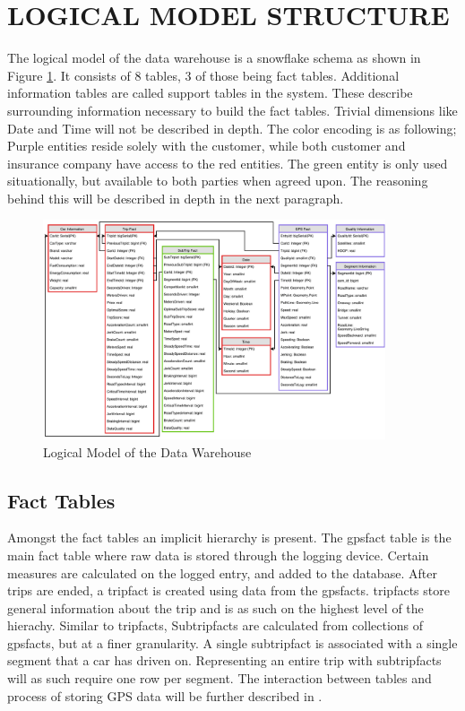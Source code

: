 \section{LOGICAL MODEL STRUCTURE}\label{sec:dataware}

The logical model of the data warehouse is a snowflake schema as shown in Figure \ref{fig:datawarehouse}. It consists of 8 tables, 3 of those being fact tables. Additional information tables are called support tables in the system. These describe surrounding information necessary to build the fact tables. Trivial dimensions like Date and Time will not be described in depth. The color encoding is as following; Purple entities reside solely with the customer, while both customer and insurance company have access to the red entities. The green entity is only used situationally, but available to both parties when agreed upon. The reasoning behind this will be described in depth in the next paragraph.

\begin{figure}[tb]
\centering
\includegraphics[width=0.9\textwidth]{Pictures/ERDiagram}
\caption{Logical Model of the Data Warehouse}
\label{fig:datawarehouse}
\end{figure}

\subsection{Fact Tables}
Amongst the fact tables an implicit hierarchy is present. The gpsfact table is the main fact table where raw data is stored through the logging device. Certain measures are calculated on the logged entry, and added to the database. After trips are ended, a tripfact is created using data from the gpsfacts. tripfacts store general information about the trip and is as such on the highest level of the hierachy. Similar to tripfacts, Subtripfacts are calculated from collections of gpsfacts, but at a finer granularity. A single subtripfact is associated with a single segment that a car has driven on. Representing an entire trip with subtripfacts will as such require one row per segment. The interaction between tables and process of storing GPS data will be further described in . 

